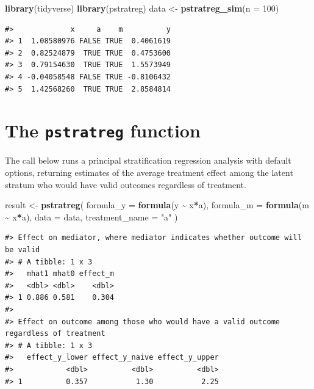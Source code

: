 \documentclass[
]{book}
\newenvironment{Shaded}{\begin{snugshade}}{\end{snugshade}}
\newcommand{\AttributeTok}[1]{\textcolor[rgb]{0.13,0.29,0.53}{#1}}
\newcommand{\DecValTok}[1]{\textcolor[rgb]{0.00,0.00,0.81}{#1}}
\newcommand{\FunctionTok}[1]{\textcolor[rgb]{0.13,0.29,0.53}{\textbf{#1}}}
\newcommand{\NormalTok}[1]{#1}
\newcommand{\OtherTok}[1]{\textcolor[rgb]{0.56,0.35,0.01}{#1}}
\newcommand{\SpecialCharTok}[1]{\textcolor[rgb]{0.81,0.36,0.00}{\textbf{#1}}}
\newcommand{\StringTok}[1]{\textcolor[rgb]{0.31,0.60,0.02}{#1}}
\begin{document}
\begin{Shaded}
\begin{Highlighting}[]
\FunctionTok{library}\NormalTok{(tidyverse)}
\FunctionTok{library}\NormalTok{(pstratreg)}
\NormalTok{data }\OtherTok{\textless{}{-}} \FunctionTok{pstratreg\_sim}\NormalTok{(}\AttributeTok{n =} \DecValTok{100}\NormalTok{)}
\end{Highlighting}
\end{Shaded}

\begin{verbatim}
#>             x     a    m          y
#> 1  1.08580976 FALSE TRUE  0.4061619
#> 2  0.82524879  TRUE TRUE  0.4753600
#> 3  0.79154630  TRUE TRUE  1.5573949
#> 4 -0.04058548 FALSE TRUE -0.8106432
#> 5  1.42568260  TRUE TRUE  2.8584814
\end{verbatim}

\hypertarget{the-pstratreg-function}{%
\section{\texorpdfstring{The \texttt{pstratreg} function}{The pstratreg function}}\label{the-pstratreg-function}}

The call below runs a principal stratification regression analysis with default options, returning estimates of the average treatment effect among the latent stratum who would have valid outcomes regardless of treatment.

\begin{Shaded}
\begin{Highlighting}[]
\NormalTok{result }\OtherTok{\textless{}{-}} \FunctionTok{pstratreg}\NormalTok{(}
  \AttributeTok{formula\_y =} \FunctionTok{formula}\NormalTok{(y }\SpecialCharTok{\textasciitilde{}}\NormalTok{ x}\SpecialCharTok{*}\NormalTok{a),}
  \AttributeTok{formula\_m =} \FunctionTok{formula}\NormalTok{(m }\SpecialCharTok{\textasciitilde{}}\NormalTok{ x}\SpecialCharTok{*}\NormalTok{a),}
  \AttributeTok{data =}\NormalTok{ data,}
  \AttributeTok{treatment\_name =} \StringTok{"a"}
\NormalTok{)}
\end{Highlighting}
\end{Shaded}

\begin{verbatim}
#> Effect on mediator, where mediator indicates whether outcome will be valid
#> # A tibble: 1 x 3
#>   mhat1 mhat0 effect_m
#>   <dbl> <dbl>    <dbl>
#> 1 0.886 0.581    0.304
#> 
#> Effect on outcome among those who would have a valid outcome regardless of treatment
#> # A tibble: 1 x 3
#>   effect_y_lower effect_y_naive effect_y_upper
#>            <dbl>          <dbl>          <dbl>
#> 1          0.357           1.30           2.25
\end{verbatim}
\end{document}

